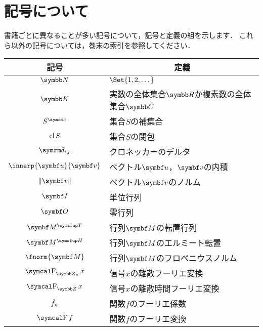\documentclass[../../main]{subfiles}
\begin{document}
\chapter{記号について}
\thispagestyle{empty}
書籍ごとに異なることが多い記号について，記号と定義の組を示します．
これら以外の記号については，巻末の索引を参照してください．

\vspace*{\fill}
\begin{table*}
  \centering
  \begin{tabular}{c|l} \hline
    記号 & \multicolumn{1}{c}{定義} \\ \hline
    \(\numset{N}\) & \(\Set{1,2,\dotsc}\) \\
    \(\numset{K}\) & 実数の全体集合\(\numset{R}\)か複素数の全体集合\(\numset{C}\) \\
    \(\scomp{S}\) & 集合\(S\)の補集合 \\
    \(\operatorname{cl} S\) & 集合\(S\)の閉包 \\
    \(\kdelta{i}{j}\) & クロネッカーのデルタ \\
    \(\innerp{\vect{u}}{\vect{v}}\) & ベクトル\(\vect{u}\)，\(\vect{v}\)の内積 \\
    \(\vnorm{\vect{v}}\) & ベクトル\(\vect{v}\)のノルム \\
    \(\imat\) & 単位行列 \\
    \(\zmat\) & 零行列 \\
    \(\trps{\mat{M}}\) & 行列\(\mat{M}\)の転置行列 \\
    \(\htrps{\mat{M}}\) & 行列\(\mat{M}\)のエルミート転置 \\
    \(\fnorm{\mat{M}}\) & 行列\(\mat{M}\)のフロベニウスノルム \\
    \(\dft{n}{x}\) & 信号\(x\)の離散フーリエ変換 \\
    \(\dtft x\) & 信号\(x\)の離散時間フーリエ変換 \\
    \(\hat{f}_n\) & 関数\(f\)のフーリエ係数 \\
    \(\ftrans f\) & 関数\(f\)のフーリエ変換 \\ \hline
  \end{tabular}
\end{table*}
\vspace*{\fill}
\end{document}
